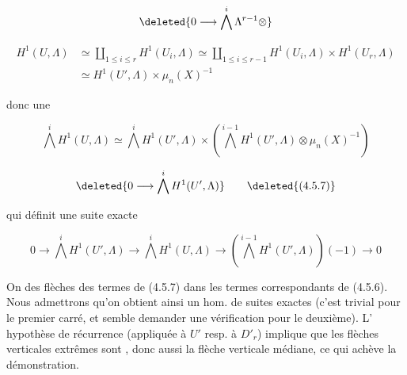 
\[
\deleted{0\longrightarrow\bigwedge^i\Lambda^{r-1}\otimes}
\]

\[
\begin{aligned}
H^1(U,\Lambda)&\simeq\coprod_{1\leq i\leq r}H^1(U_i,\Lambda)\simeq\coprod_{1\leq i\leq r-1}H^1(U_i,\Lambda)\times H^1(U_r,\Lambda)\\
&\simeq H^1(U',\Lambda)\times\mu_n(X)^{-1}
\end{aligned}
\]

donc une  

\[
\bigwedge^iH^1(U,\Lambda)\simeq\bigwedge^iH^1(U',\Lambda)\times\left(\bigwedge^{i-1}H^1(U',\Lambda)\otimes\mu_n(X)^{-1}\right)
\]

\[
\deleted{0\longrightarrow\bigwedge^iH^1(U',\Lambda)}
\tag*{\deleted{(4.5.7)}}
\]

 qui définit une suite exacte

\[
0\longrightarrow\bigwedge^iH^1(U',\Lambda)\longrightarrow\bigwedge^iH^1(U,\Lambda)\longrightarrow\left(\bigwedge^{i-1}H^1(U',\Lambda)\right)(-1)\longrightarrow0
\tag*{(4.5.7)}
\]

On    des flèches  des termes de (4.5.7) dans les termes correspondants de (4.5.6). Nous admettrons qu'on obtient ainsi un hom. de suites exactes (c'est trivial pour le premier carré, et semble demander une vérification pour le deuxième). L' hypothèse de récurrence (appliquée à  $U'$ resp. à $D'_r$) implique que les flèches verticales extrêmes sont  , donc aussi la flèche verticale médiane, ce qui achève la démonstration.
